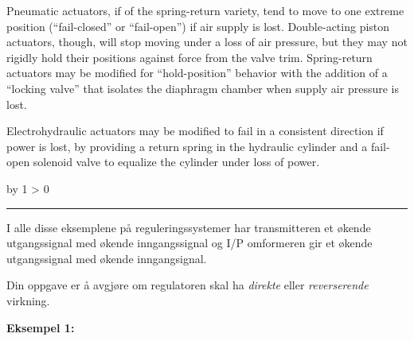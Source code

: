 \documentclass[12pt,a4paper]{article}
\def\oppgave{
            \advance\questnum by 1
            \ifnum \questnum > 0
                 \hrule
                 \vskip 3pt
                 \leftline{Oppgave \the\questnum}
                 \vskip 3pt \fi}
\begin{document}
\vskip 10pt

Pneumatic actuators, if of the spring-return variety, tend to move to one extreme position (``fail-closed'' or ``fail-open'') if air supply is lost.  Double-acting piston actuators, though, will stop moving under a loss of air pressure, but they may not rigidly hold their positions against force from the valve trim.  Spring-return actuators may be modified for ``hold-position'' behavior with the addition of a ``locking valve'' that isolates the diaphragm chamber when supply air pressure is lost.

\vskip 10pt

Electrohydraulic actuators may be modified to fail in a consistent direction if power is lost, by providing a return spring in the hydraulic cylinder and a fail-open solenoid valve to equalize the cylinder under loss of power.


\vfil \eject 



\oppgave{} 

I alle disse eksemplene på reguleringssystemer har transmitteren et økende utgangssignal med økende inngangssignal og I/P omformeren gir et økende utgangssignal med økende inngangsignal.


Din oppgave er å avgjøre om regulatoren skal ha \textit{direkte} eller \textit{reverserende} virkning. 


\vskip 10pt

\noindent
{\bf Eksempel 1:}
\end{document}
